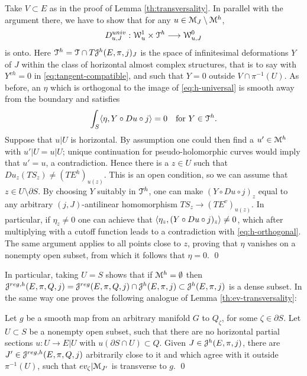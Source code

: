 \documentclass[10pt,letterpaper]{article}
\begin{document}
\proof Take $V \subset E$ as in the proof of Lemma \ref{th:transversality}. In
parallel with the argument there, we have to show that for any $u \in \mathcal{M}_J
\setminus \mathcal{M}^h$,
\begin{equation} \label{eq:h-universal}
D_{u,J}^{univ}: \mathcal{W}^1_u \times \mathcal{T}^h \longrightarrow \mathcal{W}^0_{u,J}
\end{equation}
is onto. Here $\mathcal{T}^h = \mathcal{T} \cap T\mathcal{J}^h(E,\pi,j)_J$ is the space of
infinitesimal deformations $Y$ of $J$ within the class of horizontal almost
complex structures, that is to say with $Y^{vh} = 0$ in
\eqref{eq:tangent-compatible}, and such that $Y = 0$ outside $V \cap
\pi^{-1}(U)$. As before, an $\eta$ which is orthogonal to the image of
\eqref{eq:h-universal} is smooth away from the boundary and satisfies
\begin{equation} \label{eq:h-orthogonal}
 \int_S \langle \eta, Y \circ Du \circ j \rangle = 0
 \quad \text{for $Y \in \mathcal{T}^h.$}
\end{equation}
Suppose that $u|U$ is horizontal. By assumption one could then find a $u' \in
\mathcal{M}^h$ with $u'|U = u|U$; unique continuation for pseudo-holomorphic curves
would imply that $u' = u$, a contradiction. Hence there is a $z \in U$ such
that $Du_z(TS_z) \neq (TE^h)_{u(z)}$. This is an open condition, so we can
assume that $z \in U \setminus \partial S$. By choosing $Y$ suitably in
$\mathcal{T}^h$, one can make $(Y \circ Du \circ j)_z$ equal to any arbitrary
$(j,J)$-antilinear homomorphism $TS_z \rightarrow (TE^v)_{u(z)}$. In
particular, if $\eta_z \neq 0$ one can achieve that $\langle \eta_z, (Y \circ
Du \circ j)_z \rangle \neq 0$, which after multiplying with a cutoff function
leads to a contradiction with \eqref{eq:h-orthogonal}. The same argument
applies to all points close to $z$, proving that $\eta$ vanishes on a nonempty
open subset, from which it follows that $\eta = 0$. \qed

In particular, taking $U = S$ shows that if $\mathcal{M}^h = \emptyset$ then
$\mathcal{J}^{reg,h}(E,\pi,Q,j) = \mathcal{J}^{reg}(E,\pi,Q,j) \cap \mathcal{J}^h(E,\pi,j) \subset
\mathcal{J}^h(E,\pi,j)$ is a dense subset. In the same way one proves the following
analogue of Lemma \ref{th:ev-transversality}:

\begin{lemma} \label{th:horizontal-ev-transversality}
Let $g$ be a smooth map from an arbitrary manifold $G$ to $Q_\zeta$, for some
$\zeta \in \partial S$. Let $U \subset S$ be a nonempty open subset, such that
there are no horizontal partial sections $u: U \rightarrow E|U$ with
$u(\partial S \cap U) \subset Q$. Given $J \in \mathcal{J}^h(E,\pi,j)$, there are $J'
\in \mathcal{J}^{reg,h}(E,\pi,Q,j)$ arbitrarily close to it and which agree with it
outside $\pi^{-1}(U)$, such that $ev_\zeta | \mathcal{M}_{J'}$ is transverse to $g$.
\qed
\end{lemma}
\end{document}
